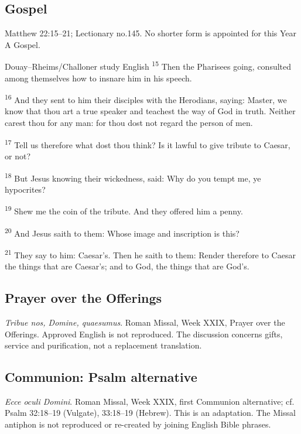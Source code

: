 \subsection{Gospel}
\label{proper-gospel}
Matthew 22:15--21; Lectionary no.145. No shorter form is appointed for this Year A Gospel.
\begin{englishwitness}{Douay--Rheims/Challoner study English}
\textsuperscript{15} Then the Pharisees going, consulted among themselves how to insnare him in his speech.

\textsuperscript{16} And they sent to him their disciples with the Herodians, saying: Master, we know that thou art a true speaker and teachest the way of God in truth. Neither carest thou for any man: for thou dost not regard the person of men.

\textsuperscript{17} Tell us therefore what dost thou think? Is it lawful to give tribute to Caesar, or not?

\textsuperscript{18} But Jesus knowing their wickedness, said: Why do you tempt me, ye hypocrites?

\textsuperscript{19} Shew me the coin of the tribute. And they offered him a penny.

\textsuperscript{20} And Jesus saith to them: Whose image and inscription is this?

\textsuperscript{21} They say to him: Caesar’s. Then he saith to them: Render therefore to Caesar the things that are Caesar’s; and to God, the things that are God’s.
\end{englishwitness}

\subsection{Prayer over the Offerings}
\label{proper-offerings}
\textit{Tribue nos, Domine, quaesumus}. Roman Missal, Week XXIX, Prayer over the Offerings. Approved English is not reproduced. The discussion concerns gifts, service and purification, not a replacement translation.

\subsection{Communion: Psalm alternative}
\label{proper-communion-psalm}
\textit{Ecce oculi Domini}. Roman Missal, Week XXIX, first Communion alternative; cf. Psalm 32:18--19 (Vulgate), 33:18--19 (Hebrew). This is an adaptation. The Missal antiphon is not reproduced or re-created by joining English Bible phrases.

